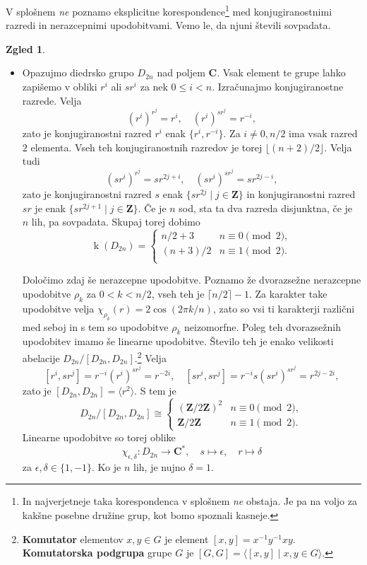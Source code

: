 \documentclass[11pt]{book}
\def\ZZ{\mathbf{Z}}
\def\CC{\mathbf{C}}
\DeclareMathOperator\kk{k}
\def\definicija{\color{rdeca}\bf}
\theoremstyle{definition}
\theoremstyle{zgled}
\newtheorem{zgled}[theorem]{Zgled}
\theoremstyle{zgledbrezstevilke}
\theoremstyle{odprtproblem}
\theoremstyle{domacanaloga}
\theoremstyle{izrek}
\begin{document}
V splošnem \emph{ne} poznamo eksplicitne korespondence\footnote{In najverjetneje taka korespondenca v splošnem \emph{ne} obstaja. Je pa na voljo za kakšne posebne družine grup, kot bomo spoznali kasneje.}  med konjugiranostnimi razredi in nerazcepnimi upodobitvami. Vemo le, da njuni števili sovpadata.

\begin{zgled} \leavevmode
\begin{itemize}
\item Opazujmo diedrsko grupo $D_{2n}$ nad poljem $\CC$. Vsak element te grupe lahko zapišemo v obliki $r^i$ ali $s r^i$ za nek $0 \leq i < n$. Izračunajmo konjugiranostne razrede. Velja
\[
    \left( r^i \right)^{r^j} = r^i, \quad
    \left( r^i \right)^{s r^j} = r^{-i},
\]
zato je konjugiranostni razred $r^i$ enak $\{ r^{i}, r^{-i} \}$. Za $i \neq 0, n/2$ ima vsak razred $2$ elementa. Vseh teh konjugiranostnih razredov je torej $\lfloor (n+2)/2 \rfloor$.
Velja tudi
\[
    \left( s r^i \right)^{r^j} = s r^{2j + i}, \quad
    \left( s r^i \right)^{s r^j} = s r^{2j - i},   
\]
zato je konjugiranostni razred $s$ enak $\{ s r^{2j} \mid j \in \ZZ \}$ in konjugiranostni razred $sr$ je enak $\{ s r^{2j + 1} \mid j \in \ZZ \}$. Če je $n$ sod, sta ta dva razreda disjunktna, če je $n$ lih, pa sovpadata. Skupaj torej dobimo
\[
    \kk(D_{2n}) = \begin{cases}
        n/2 + 3 & n \equiv 0 \pmod{2}, \\
        (n+3)/2 & n \equiv 1 \pmod{2}. \\
    \end{cases}
\]

Določimo zdaj še nerazcepne upodobitve. Poznamo že dvorazsežne nerazcepne upodobitve $\rho_k$ za $0 < k < n/2$, vseh teh je $\lceil n/2 \rceil - 1$. Za karakter take upodobitve velja $\chi_{\rho_k}(r) = 2 \cos(2 \pi k / n)$, zato so vsi ti karakterji različni med seboj in s tem so upodobitve $\rho_k$ neizomorfne. Poleg teh dvorazsežnih upodobitev imamo še linearne upodobitve. Število teh je enako velikosti abelacije $D_{2n}/[D_{2n}, D_{2n}]$.\footnote{{\definicija Komutator} elementov $x,y \in G$ je element $[x,y] = x^{-1} y^{-1} x y$. {\definicija Komutatorska podgrupa} grupe $G$ je $[G,G] = \langle [x,y] \mid x,y \in G \rangle$.} Velja
\[
    [r^i, s r^j] = r^{-i} \left( r^i \right)^{s r^j} = r^{-2i}, \quad
    [s r^i, s r^j] = r^{-i} s \left( s r^i \right)^{s r^j} = r^{2j - 2i},
\]
zato je $[D_{2n}, D_{2n}] = \langle r^2 \rangle$. S tem je 
\[
    D_{2n}/[D_{2n}, D_{2n}] \cong \begin{cases}
        (\ZZ/2\ZZ)^2 & n \equiv 0 \pmod{2}, \\
        \ZZ/2\ZZ & n \equiv 1 \pmod{2}.
    \end{cases}
\]
Linearne upodobitve so torej oblike
\[
    \chi_{\epsilon, \delta} \colon D_{2n} \to \CC^*, \quad
    s \mapsto \epsilon, \quad
    r \mapsto \delta
\]
za $\epsilon, \delta \in \{ 1, -1 \}$. Ko je $n$ lih, je nujno $\delta = 1$.


\end{itemize}
\end{zgled}
\end{document}
